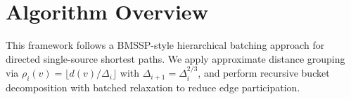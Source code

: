 \section{Algorithm Overview}
This framework follows a BMSSP-style hierarchical batching approach for directed single-source shortest paths.
We apply approximate distance grouping via $\rho_i(v)=\lfloor d(v)/\Delta_i \rfloor$ with $\Delta_{i+1}=\Delta_i^{2/3}$, and perform recursive bucket decomposition
with batched relaxation to reduce edge participation.
